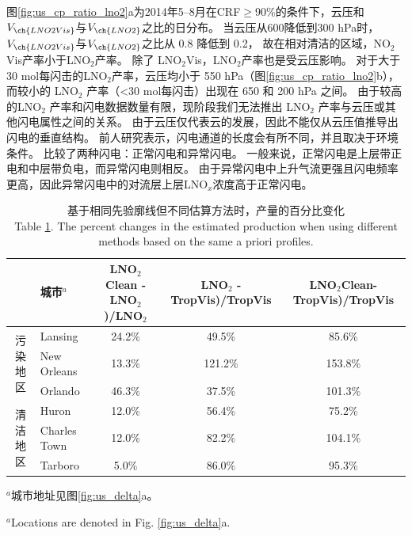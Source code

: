 图\ref{fig:us_cp_ratio_lno2}a为2014年5--8月在CRF$\geq$90\%的条件下，云压和$V_{\ch{LNO2Vis}}$与$V_{\ch{LNO2}}$之比的日分布。
当云压从600降低到300 hPa时，$V_{\ch{LNO2Vis}}$与$V_{\ch{LNO2}}$之比从 0.8 降低到 0.2，
故在相对清洁的区域，NO$_2$Vis产率小于LNO$_2$产率。
除了 LNO$_2$Vis，LNO$_2$产率也是受云压影响。
对于大于 30 mol每闪击的LNO$_2$产率，云压均小于 550 hPa（图\ref{fig:us_cp_ratio_lno2}b），
而较小的 LNO$_2$ 产率（<30 mol每闪击）出现在 650 和 200 hPa 之间。
由于较高的LNO$_2$ 产率和闪电数据数量有限，现阶段我们无法推出 LNO$_2$ 产率与云压或其他闪电属性之间的关系。
由于云压仅代表云的发展，因此不能仅从云压值推导出闪电的垂直结构。
前人研究表示，闪电通道的长度会有所不同，并且取决于环境条件\citep{Carey.2016,Mecikalski.2017,Fuchs.2018}。
\citet{Davis.2019}比较了两种闪电：正常闪电和异常闪电。
一般来说，正常闪电是上层带正电和中层带负电，而异常闪电则相反\citep{Williams.1989}。
由于异常闪电中上升气流更强且闪电频率更高，因此异常闪电中的对流层上层LNO$_x$浓度高于正常闪电。


\begin{table}[htbp]
\caption{基于相同先验廓线但不同估算方法时，产量的百分比变化\\Table \ref{table:production_comp}. The percent changes in the estimated production when using different methods based on the same a priori profiles.}
\scriptsize
\begin{tabular}{clccc}
\hline
 & 城市$^a$ & LNO$_2$Clean - LNO$_2$)/LNO$_2$ & LNO$_2$ - TropVis)/TropVis & LNO$_2$Clean-TropVis)/TropVis \\
\hline
\multirow{3}{*}{污染地区} & Lansing          & 24.2\%  & 49.5\%   & 85.6\%   \\
                         & New Orleans      & 13.3\%  & 121.2\%  & 153.8\%  \\
                         & Orlando          & 46.3\%  & 37.5\%   & 101.3\%  \\
\hline
\multirow{3}{*}{清洁地区}    & Huron            & 12.0\%  & 56.4\%   & 75.2\%   \\
                            & Charles Town     & 12.0\%  & 82.2\%   & 104.1\%  \\
                            & Tarboro          & 5.0\%   & 86.0\%   & 95.3\%   \\
\hline
\end{tabular}
\begin{tablenotes}
\footnotesize
\item $^a$城市地址见图\ref{fig:us_delta}a。
\item $^a$Locations are denoted in Fig. \ref{fig:us_delta}a.
\end{tablenotes}
\label{table:production_comp}
\end{table}

